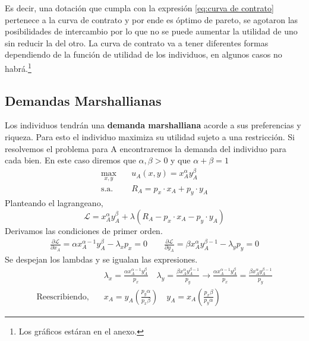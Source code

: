 Es decir, una dotación que cumpla con la expresión \ref{eq:curva de contrato} pertenece a la curva de contrato y por ende es óptimo de pareto, se agotaron las posibilidades de intercambio por lo que no se puede aumentar la utilidad de uno sin reducir la del otro. La curva de contrato va a tener diferentes formas dependiendo de la función de utilidad de los individuos, en algunos casos no habrá.\footnote{Los gráficos estáran en el anexo.} 

\subsection{Demandas Marshallianas}

Los individuos tendrán una \textbf{demanda marshalliana} acorde a sus preferencias y riqueza. Para esto el individuo maximiza su utilidad sujeto a una restricción. Si resolvemos el problema para A encontraremos la demanda del individuo para cada bien. En este caso diremos que $\alpha,\beta >0$ y que $\alpha + \beta = 1$
\begin{align*}
    \max_{x,y} &\quad u_A(x,y) = x_A^\alpha y_A^{\beta}\quad \\
    \text{s.a.} &\quad R_A = p_x \cdot x_A + p_y \cdot y_A
\end{align*}
Planteando el lagrangeano,
\begin{equation*}
    \mathcal{L}= x_A^\alpha y_A^{\beta} + \lambda (R_A - p_x \cdot x_A - p_y \cdot y_A)
\end{equation*}
Derivamos las condiciones de primer orden.
\begin{align*}
    \frac{\partial \mathcal{L}}{\partial x_A} = \alpha x_A^{\alpha-1}y_A^\beta - \lambda_x p_x = 0 \quad \quad
    \frac{\partial \mathcal{L}}{\partial y_A} = \beta x_A^\alpha y_A^{\beta -1} - \lambda_y p_y = 0
\end{align*}
Se despejan los lambdas y se igualan las expresiones.
\begin{align*}
    & \lambda_x = \frac{\alpha x_A^{\alpha-1}y_A^\beta }{p_x} \quad 
    \lambda_y = \frac{\beta x_A^\alpha y_A^{\beta-1}}{p_y} \longrightarrow \frac{\alpha x_A^{\alpha-1}y_A^\beta }{p_x} = \frac{\beta x_A^\alpha y_A^{\beta-1}}{p_y} \\
    \text{Reescribiendo,}\quad & x_A = y_A  \left( \frac{p_y \alpha}{p_x \beta} \right)  \quad y_A = x_A \left(  \frac{p_x \beta}{p_y\alpha}  \right)
\end{align*}
